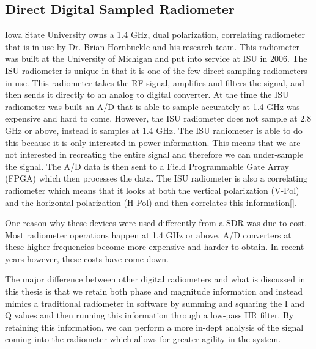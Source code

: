 \subsection{Direct Digital Sampled Radiometer}  
Iowa State University owns a 1.4 GHz, dual polarization, correlating radiometer that is in use by Dr. Brian Hornbuckle and his research team.  This radiometer was built at the University of Michigan and put into service at ISU in 2006.  The ISU radiometer is unique in that it is one of the few direct sampling radiometers in use\cite{Erbas}.  This radiometer takes the RF signal, amplifies and filters the signal, and then sends it directly to an analog to digital converter.  At the time the ISU radiometer was built an A/D that is able to sample accurately at 1.4 GHz was expensive and hard to come.  However, the ISU radiometer does not sample at 2.8 GHz or above, instead it samples at 1.4 GHz.  The ISU radiometer is able to do this because it is only interested in power information.  This means that we are not interested in recreating the entire signal and therefore we can under-sample the signal.  The A/D data is then sent to a Field Programmable Gate Array (FPGA) which then processes the data.  The ISU radiometer is also a correlating radiometer which means that it looks at both the vertical polarization (V-Pol) and the horizontal polarization (H-Pol) and then correlates this information[\cite{Fischman2001}]. 

One reason why these devices were used differently from a SDR was due to cost.  Most radiometer operations happen at 1.4 GHz or above.  A/D converters at these higher frequencies become more expensive and harder to obtain.  In recent years however, these costs have come down.

The major difference between other digital radiometers and what is discussed in this thesis is that we retain both phase and magnitude information and instead mimics a traditional radiometer in software by summing and squaring the I and Q values and then running this information through a low-pass IIR filter.  By retaining this information, we can perform a more in-dept analysis of the signal coming into the radiometer which allows for greater agility in the system.


